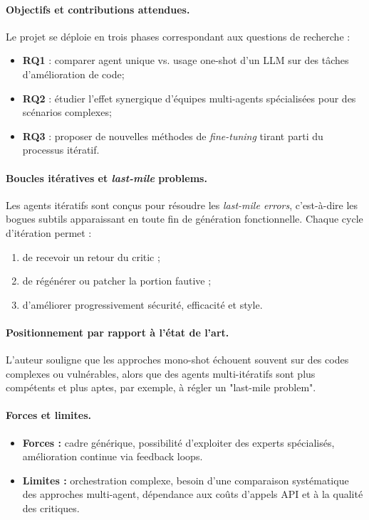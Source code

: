 \paragraph{Objectifs et contributions attendues.}
Le projet se déploie en trois phases correspondant aux questions de recherche :  
\begin{itemize}
  \item \textbf{RQ1} : comparer agent unique vs. usage one-shot d’un LLM sur des tâches d’amélioration de code;
  \item \textbf{RQ2} : étudier l’effet synergique d’équipes multi-agents spécialisées pour des scénarios complexes;
  \item \textbf{RQ3} : proposer de nouvelles méthodes de \emph{fine-tuning} tirant parti du processus itératif.
\end{itemize}

\paragraph{Boucles itératives et \emph{last-mile} problems.}
Les agents itératifs sont conçus pour résoudre les \textit{last-mile errors}, c’est-à-dire les bogues subtils apparaissant en toute fin de génération fonctionnelle. Chaque cycle d’itération permet :
\begin{enumerate}
  \item de recevoir un retour du critic ;
  \item de régénérer ou patcher la portion fautive ;
  \item d’améliorer progressivement sécurité, efficacité et style.
\end{enumerate}

\paragraph{Positionnement par rapport à l’état de l’art.}
L’auteur souligne que les approches mono-shot échouent souvent sur des codes complexes ou vulnérables, alors que des agents multi-itératifs sont plus compétents et plus aptes, par exemple, à régler un "last-mile problem".

\paragraph{Forces et limites.}
\begin{itemize}
  \item \textbf{Forces :} cadre générique, possibilité d’exploiter des experts spécialisés, amélioration continue via feedback loops.
  \item \textbf{Limites :} orchestration complexe, besoin d’une comparaison systématique des approches multi-agent, dépendance aux coûts d’appels API et à la qualité des critiques.
\end{itemize}

